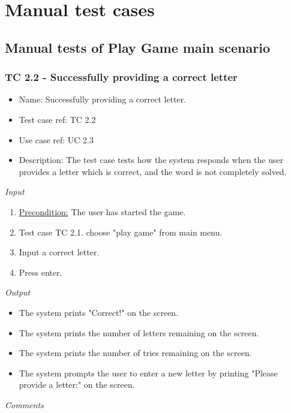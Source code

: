 \documentclass[12pt, letterpaper]{article}
\begin{document}
\section{Manual test cases}
\subsection{Manual tests of Play Game main scenario}
\subsubsection{TC 2.2 - Successfully providing a correct letter}
\begin{itemize}
	\item Name: Successfully providing a correct letter.
	\item Test case ref: TC 2.2
	\item Use case ref: UC 2.3
	\item Description: The test case tests how the system responds when the user provides a letter which is correct, and the word is not completely solved.
\end{itemize}
\emph{Input}
\begin{enumerate}
	\item \underline{Precondition:} The user has started the game.
	\item Test case TC 2.1. choose "play game" from main menu.
	\item Input a correct letter.
	\item Press enter.
\end{enumerate}
\emph{Output}
\begin{itemize}
	\item The system prints "Correct!" on the screen.
	\item The system prints the number of letters remaining on the screen.
	\item The system prints the number of tries remaining on the screen.
	\item The system prompts the user to enter a new letter by printing "Please provide a letter:" on the screen.
\end{itemize}
\emph{Comments}
\newline
\newline
\newline
\newline
\newline
\newline
\newline
\end{document}
